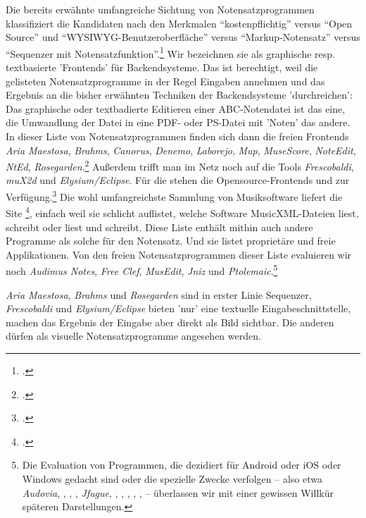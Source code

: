 Die bereits erwähnte umfangreiche Sichtung von Notensatzprogrammen klassifiziert
die Kandidaten nach den Merkmalen \enquote{kostenpflichtig} versus \enquote{Open
Source} und \enquote{WYSIWYG-Benutzeroberfläche} versus
\enquote{Markup-Notensatz} versus \enquote{Sequenzer mit
Notensatzfunktion}.\footcite[vgl.][\nopage wp.]{WpedNotensatz2019a} Wir
bezeichnen sie als graphische resp. textbasierte 'Frontends' für
Backendsysteme. Das ist berechtigt, weil die gelisteten Notensatzprogramme in
der Regel Eingaben annehmen und das Ergebnis an die bisher erwähnten Techniken
der Backendsysteme 'durchreichen': Das graphische oder textbadierte Editieren
einer ABC-Notendatei ist das eine, die Umwandlung der Datei in eine PDF- oder
PS-Datei mit 'Noten' das andere. In dieser Liste von Notensatzprogrammen finden
sich dann die freien Frontends \textit{Aria Maestosa}, \textit{Brahms},
\textit{Canorus}, \textit{Denemo}, \textit{Laborejo}, \textit{Mup},
\textit{MuseScore}, \textit{NoteEdit}, \textit{NtEd},
\textit{Rosegarden}.\footcite[vgl.][\nopage wp.]{WpedNotensatz2019a} Außerdem
trifft man im Netz noch auf die Tools \textit{Frescobaldi}, \textit{muX2d} und
\textit{Elysium/Eclipse}. Für die  stehen die
Opensource-Frontends  und  zur
Verfügung.\footcite[vgl.][\nopage wp.]{Abc2018b} Die wohl umfangreichste Sammlung
von Musiksoftware liefert die Site \footcite[vgl.][\nopage
wp.]{MusicXML2018b}, einfach weil sie schlicht auflistet, welche Software
MusicXML-Dateien liest, schreibt oder liest und schreibt. Diese Liste enthält
mithin auch andere Programme als solche für den Notensatz. Und sie listet
proprietäre und freie Applikationen. Von den freien Notensatzprogrammen dieser
Liste evaluieren wir noch \textit{Audimus Notes}, \textit{Free Clef},
\textit{MusEdit}, \textit{Jniz} und \textit{Ptolemaic}.\footnote{Die Evaluation
von Programmen, die dezidiert für Android oder iOS oder Windows gedacht sind
oder die spezielle Zwecke verfolgen -- also etwa \textit{Audovia},
, , , \textit{Jfugue}, ,
, , , ,  -- überlassen wir mit einer gewissen Willkür
späteren Darstellungen.}


\textit{Aria Maestosa}, \textit{Brahms} und \textit{Rosegarden}
sind in erster Linie \textsf{Sequenzer}, \textit{Frescobaldi} und
\textit{Elysium/Eclipse} bieten 'nur' eine textuelle Eingabeschnittstelle,
machen das Ergebnis der Eingabe aber direkt als Bild sichtbar. Die anderen
dürfen als visuelle Notensatzprogramme angesehen werden.

